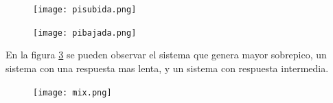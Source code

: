     \begin{figure}[h!]
    	\centering
    	\texttt{[image: pisubida.png]}
    	\label{fig:pisubuda}
    \end{figure}
    
    \begin{figure}[h!]
    	\centering
    	\texttt{[image: pibajada.png]}
    	\label{fig:pibajada}
    \end{figure}
    
    
    En la figura \ref{fig:mix} se pueden observar el sistema que genera mayor sobrepico, un sistema con una respuesta mas lenta, y un sistema con respuesta intermedia. 
    \begin{figure}[h!]
    	\centering
    	\texttt{[image: mix.png]}
    	\label{fig:mix}
    \end{figure}
    
    \newpage